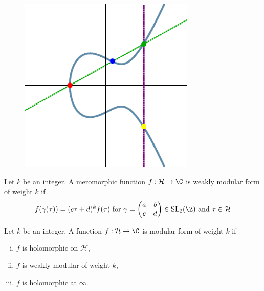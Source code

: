 \begin{frame}
	\begin{figure}[h]
	\centering
	\includegraphics[width=0.75\textwidth]{images/ec_add.eps}
	\end{figure}
\end{frame}



\begin{frame}[plain]
\end{frame}



\begin{frame}
\begin{dfn}
Let $k$ be an integer. A meromorphic function $f: \mathcal{H} \to \C$ is weakly modular form of weight $k$ if
	\[
	f(\gamma(\tau))= (c\tau+d)^k f(\tau) \text{ for } \gamma= \begin{pmatrix} a & b \\ c & d \end{pmatrix} \in \text{SL}_2(\Z) \text{ and } \tau  \in \mathcal{H}
	\]
\end{dfn}

\begin{dfn}
Let $k$ be an integer. A function $f: \mathcal{H} \to \C$ is modular form of weight $k$ if

\begin{enumerate}[(i)]
\item $f$ is holomorphic on $\mathcal{H}$,
\item $f$ is weakly modular of weight $k$,
\item $f$ is holomorphic at $\infty$. 
\end{enumerate}
\end{dfn}

\end{frame}



